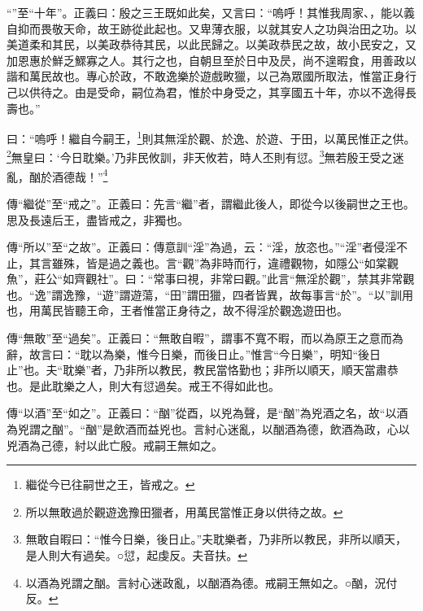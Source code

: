{\noindent\shu{}\fzkt “”至“十年”。正義曰：殷之三王既如此矣，又言曰：“嗚呼！其惟我周家、，能以義自抑而畏敬天命，故王跡從此起也。又卑薄衣服，以就其安人之功與治田之功。以美道柔和其民，以美政恭待其民，以此民歸之。以美政恭民之故，故小民安之，又加恩惠於鮮乏鰥寡之人。其行之也，自朝旦至於日中及昃，尚不遑暇食，用善政以諧和萬民故也。專心於政，不敢逸樂於遊戲畋獵，以己為眾國所取法，惟當正身行己以供待之。由是受命，嗣位為君，惟於中身受之，其享國五十年，亦以不逸得長壽也。” \par}

曰：“嗚呼！繼自今嗣王，\footnote{繼從今已往嗣世之王，皆戒之。}則其無淫於觀、於逸、於遊、于田，以萬民惟正之供。\footnote{所以無敢過於觀遊逸豫田獵者，用萬民當惟正身以供待之故。}無皇曰：‘今日耽樂。’乃非民攸訓，非天攸若，時人丕則有愆。\footnote{無敢自暇曰：“惟今日樂，後日止。”夫耽樂者，乃非所以教民，非所以順天，是人則大有過矣。○愆，起虔反。夫音扶。}無若殷王受之迷亂，酗於酒德哉！”\footnote{以酒為兇謂之酗。言紂心迷政亂，以酗酒為德。戒嗣王無如之。○酗，況付反。}


{\noindent\zhuan{}\fzbyks 傳“繼從”至“戒之”。正義曰：先言“繼”者，謂繼此後人，即從今以後嗣世之王也。思及長遠后王，盡皆戒之，非獨也。 \par}

{\noindent\zhuan{}\fzbyks 傳“所以”至“之故”。正義曰：傳意訓“淫”為過，云：“淫，放恣也。”“淫”者侵淫不止，其言雖殊，皆是過之義也。言“觀”為非時而行，違禮觀物，如隱公“如棠觀魚”，莊公“如齊觀社”。曰：“常事曰視，非常曰觀。”此言“無淫於觀”，禁其非常觀也。“逸”謂逸豫，“遊”謂遊蕩，“田”謂田獵，四者皆異，故每事言“於”。“以”訓用也，用萬民皆聽王命，王者惟當正身待之，故不得淫於觀逸遊田也。 \par}

{\noindent\zhuan{}\fzbyks 傳“無敢”至“過矣”。正義曰：“無敢自暇”，謂事不寬不暇，而以為原王之意而為辭，故言曰：“耽以為樂，惟今日樂，而後日止。”惟言“今日樂”，明知“後日止”也。夫“耽樂”者，乃非所以教民，教民當恪勤也；非所以順天，順天當肅恭也。是此耽樂之人，則大有愆過矣。戒王不得如此也。 \par}

{\noindent\zhuan{}\fzbyks 傳“以酒”至“如之”。正義曰：“酗”從酉，以兇為聲，是“酗”為兇酒之名，故“以酒為兇謂之酗”。“酗”是飲酒而益兇也。言紂心迷亂，以酗酒為德，飲酒為政，心以兇酒為己德，紂以此亡殷。戒嗣王無如之。 \par}


